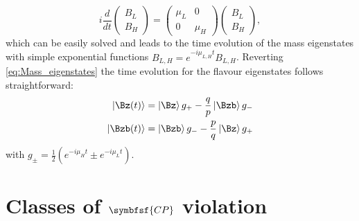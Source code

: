 \begin{equation}
i\frac{d}{dt}\begin{pmatrix} B_L \\ B_H \end{pmatrix} = \begin{pmatrix} \mu_L & 0 \\ 0 & \mu_H \end{pmatrix}\begin{pmatrix} B_L \\ B_H \end{pmatrix},
\end{equation}
which can be easily solved and leads to the time evolution of the mass eigenstates with simple exponential functions $B_{L,H}=e^{-i\mu_{L,H}t}B_{L,H}$.
Reverting \cref{eq:Mass_eigenstates} the time evolution for the flavour eigenstates follows straightforward:
\begin{equation}
\begin{split}
\left|\Bz\!\left(t\right)\right>&=\left|\Bz\right>g_+-\frac{q}{p}\left|\Bzb\right>g_-\\
\left|\Bzb\!\left(t\right)\right>&=\left|\Bzb\right>g_--\frac{p}{q}\left|\Bz\right>g_+ \label{eq:timeEvolution}
\end{split}
\end{equation}
with $g_\pm=\frac{1}{2}\left(e^{-i\mu_Ht}\pm e^{-i\mu_Lt}\right)$.

\section[head={Types of \CP violation},tocentry={Classes of \CP violation}]{Classes of $\symbfsf{C{}P}$ violation}
\label{sec:CPVClasses}


